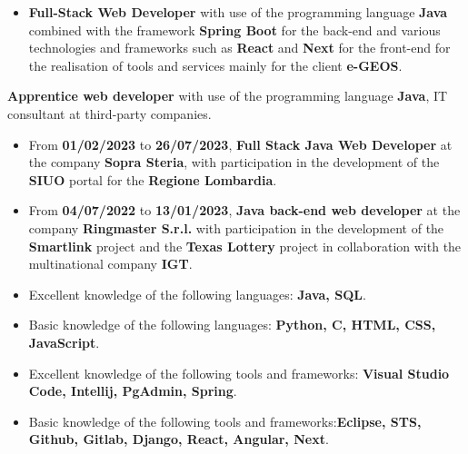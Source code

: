 \documentclass[10pt,a4paper]{altacv}
\begin{document}
\begin{itemize}
    \item \textbf{Full-Stack Web Developer} with use of the programming language \textbf{Java} combined with the framework \textbf{Spring Boot}
    for the back-end and various technologies and frameworks such as \textbf{React} and \textbf{Next} for the front-end for the realisation of tools and services
    mainly for the client \textbf{e-GEOS}.
\end{itemize}
\textbf{Apprentice web developer} with use of the programming language \textbf{Java}, IT consultant at
  third-party companies.
\begin{itemize}
  \item From \textbf{01/02/2023} to \textbf{26/07/2023}, \textbf{Full Stack Java Web Developer} at the company \textbf{Sopra Steria}, with participation in the development of the \textbf{SIUO} portal for the \textbf{Regione Lombardia}.
  \item From \textbf{04/07/2022} to \textbf{13/01/2023}, \textbf{Java back-end web developer} at the company \textbf{Ringmaster S.r.l.} with participation in the
  development of the \textbf{Smartlink} project and the \textbf{Texas Lottery} project in collaboration with the multinational company \textbf{IGT}.
\end{itemize}



\begin{itemize}
  \item Excellent knowledge of the following languages: \textbf{Java, SQL}.
  \item Basic knowledge of the following languages: \textbf{Python, C, HTML, CSS, JavaScript}.
  \item Excellent knowledge of the following tools and frameworks: \textbf{Visual Studio Code, Intellij, PgAdmin, Spring}.
  \item Basic knowledge of the following tools and frameworks:\textbf{Eclipse, STS, Github, Gitlab, Django, React, Angular, Next}.

  
\end{itemize}



\end{document}
